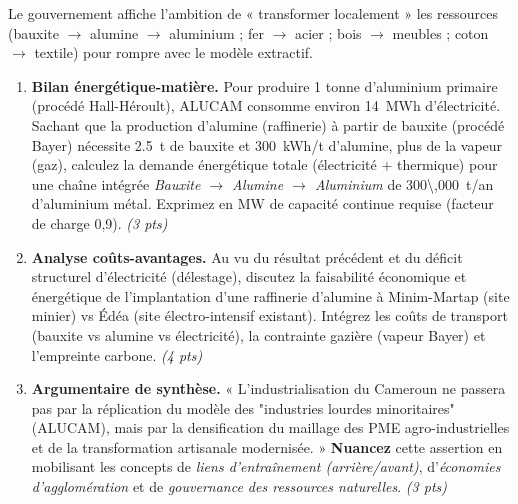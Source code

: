 \documentclass[11pt]{article}
\begin{document}
\begin{exercice}
Le gouvernement affiche l'ambition de « transformer localement » les ressources (bauxite $\rightarrow$ alumine $\rightarrow$ aluminium ; fer $\rightarrow$ acier ; bois $\rightarrow$ meubles ; coton $\rightarrow$ textile) pour rompre avec le modèle extractif.

\begin{enumerate}
    \item \textbf{Bilan énergétique-matière.} Pour produire 1 tonne d'aluminium primaire (procédé Hall-Héroult), ALUCAM consomme environ \SI{14}{MWh} d'électricité. Sachant que la production d'alumine (raffinerie) à partir de bauxite (procédé Bayer) nécessite \SI{2,5}{t} de bauxite et \SI{300}{kWh/t} d'alumine, plus de la vapeur (gaz), calculez la demande énergétique totale (électricité + thermique) pour une chaîne intégrée \textit{Bauxite $\rightarrow$ Alumine $\rightarrow$ Aluminium} de \SI{300\,000}{t/an} d'aluminium métal. Exprimez en MW de capacité continue requise (facteur de charge 0,9). \textit{(3 pts)}

    \item \textbf{Analyse coûts-avantages.} Au vu du résultat précédent et du déficit structurel d'électricité (délestage), discutez la faisabilité économique et énergétique de l'implantation d'une raffinerie d'alumine à Minim-Martap (site minier) vs Édéa (site électro-intensif existant). Intégrez les coûts de transport (bauxite vs alumine vs électricité), la contrainte gazière (vapeur Bayer) et l'empreinte carbone. \textit{(4 pts)}

    \item \textbf{Argumentaire de synthèse.} « L'industrialisation du Cameroun ne passera pas par la réplication du modèle des "industries lourdes minoritaires" (ALUCAM), mais par la densification du maillage des PME agro-industrielles et de la transformation artisanale modernisée. » \textbf{Nuancez} cette assertion en mobilisant les concepts de \textit{liens d'entraînement (arrière/avant)}, d'\textit{économies d'agglomération} et de \textit{gouvernance des ressources naturelles}. \textit{(3 pts)}
\end{enumerate}
\end{exercice}
\end{document}
